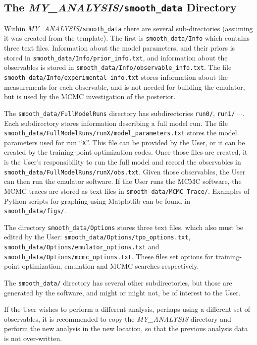 \documentclass[UserManual.tex]{subfiles}
\begin{document}
\begin{sloppypar}
\subsection{The \textit{MY\_ANALYSIS}{\tt /smooth\_data} Directory}

Within \textit{MY\_ANALYSIS}{\tt /smooth\_data} there are several sub-directories (assuming it was created from the template). The first is {\tt smooth\_data/Info} which contains three text files. Information about the model parameters, and their priors is stored in {\tt smooth\_data/Info/prior\_info.txt}, and information about the observables is stored in {\tt smooth\_data/Info/observable\_info.txt}. The file {\tt smooth\_data/Info/experimental\_info.txt} stores information about the measurements for each observable, and is not needed for building the emulator, but is used by the MCMC investigation of the posterior.

The {\tt smooth\_data/FullModelRuns} directory has subdirectories {\tt run0/}, {\tt run1/} $\cdots$. Each subdirectory stores information describing a full model run. The file {\tt smooth\_data/FullModelRuns/runX/model\_parameters.txt} stores the model parameters used for run ``{\tt X}''. This file can be provided by the User, or it can be created by the training-point optimization codes. Once those files are created, it is the User's responsibility to run the full model and record the observables in {\tt smooth\_data/FullModelRuns/runX/obs.txt}. Given those observables, the User can then run the emulator software. If the User runs the MCMC software, the MCMC traces are stored as text files in {\tt smooth\_data/MCMC\_Trace/}. Examples of Python scripts for graphing using Matplotlib can be found in {\tt smooth\_data/figs/}.

The directory {\tt smooth\_data/Options} stores three text files, which also must be edited by the User: {\tt smooth\_data/Options/tpo\_options.txt}, {\tt smooth\_data/Options/emulator\_options.txt} and {\tt smooth\_data/Options/mcmc\_options.txt}. These files set options for training-point optimization, emulation and MCMC searches respectively.

The {\tt smooth\_data/} directory has several other subdirectories, but those are generated by the software, and might or might not, be of interest to the User. 

If the User wishes to perform a different analysis, perhaps using a different set of observables, it is recommended to copy the  \textit{MY\_ANALYSIS} directory and perform the new analysis in the new location, so that the previous analysis data is not over-written.


\end{sloppypar}
\end{document}
